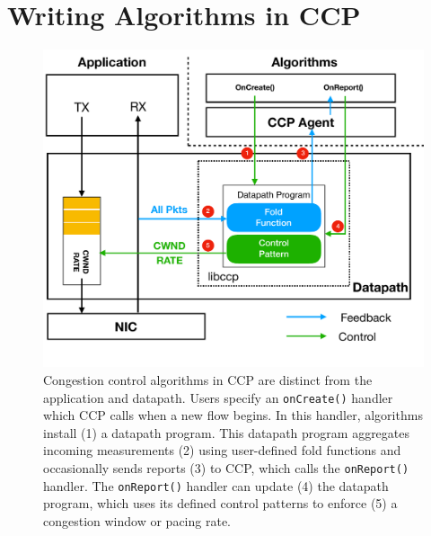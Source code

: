 \section{Writing Algorithms in CCP}
%
\begin{figure}[t]
\centering
    \includegraphics[width=\columnwidth]{img/ccp_design_sigcomm}
    \caption{Congestion control algorithms in CCP are distinct from the application and datapath.
    Users specify an \texttt{onCreate()} handler which CCP calls when a new flow begins. 
    In this handler, algorithms install (1) a datapath program. 
    This datapath program aggregates incoming measurements (2) using user-defined fold functions and occasionally sends reports (3) to CCP, which calls the \texttt{onReport()} handler.
    The \texttt{onReport()} handler can update (4) the datapath program, which uses its defined control patterns to enforce (5) a congestion window or pacing rate.
    }\label{fig:design}
\end{figure}
%
\label{sec:ccp}

